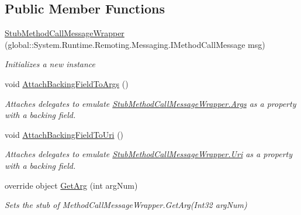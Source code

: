 \subsection*{Public Member Functions}
\begin{DoxyCompactItemize}
\item 
\hyperlink{class_system_1_1_runtime_1_1_remoting_1_1_messaging_1_1_fakes_1_1_stub_method_call_message_wrapper_a4842a518bc4e5d6257a9d557337b81b9}{Stub\-Method\-Call\-Message\-Wrapper} (global\-::\-System.\-Runtime.\-Remoting.\-Messaging.\-I\-Method\-Call\-Message msg)
\begin{DoxyCompactList}\small\item\em Initializes a new instance\end{DoxyCompactList}\item 
void \hyperlink{class_system_1_1_runtime_1_1_remoting_1_1_messaging_1_1_fakes_1_1_stub_method_call_message_wrapper_ab4e5a82b0f54a659342119cd169f2e62}{Attach\-Backing\-Field\-To\-Args} ()
\begin{DoxyCompactList}\small\item\em Attaches delegates to emulate \hyperlink{class_system_1_1_runtime_1_1_remoting_1_1_messaging_1_1_fakes_1_1_stub_method_call_message_wrapper_a0bf359c84d6c8f48bc5356621aacf392}{Stub\-Method\-Call\-Message\-Wrapper.\-Args} as a property with a backing field.\end{DoxyCompactList}\item 
void \hyperlink{class_system_1_1_runtime_1_1_remoting_1_1_messaging_1_1_fakes_1_1_stub_method_call_message_wrapper_a760188746adeb375084a1f13c5a2ca8c}{Attach\-Backing\-Field\-To\-Uri} ()
\begin{DoxyCompactList}\small\item\em Attaches delegates to emulate \hyperlink{class_system_1_1_runtime_1_1_remoting_1_1_messaging_1_1_fakes_1_1_stub_method_call_message_wrapper_a584b77381507f76a996f6d22713fe043}{Stub\-Method\-Call\-Message\-Wrapper.\-Uri} as a property with a backing field.\end{DoxyCompactList}\item 
override object \hyperlink{class_system_1_1_runtime_1_1_remoting_1_1_messaging_1_1_fakes_1_1_stub_method_call_message_wrapper_a0bfe83c3f706a1f1724d87763d7f79b4}{Get\-Arg} (int arg\-Num)
\begin{DoxyCompactList}\small\item\em Sets the stub of Method\-Call\-Message\-Wrapper.\-Get\-Arg(\-Int32 arg\-Num)\end{DoxyCompactList}\item 

\end{DoxyCompactItemize}
